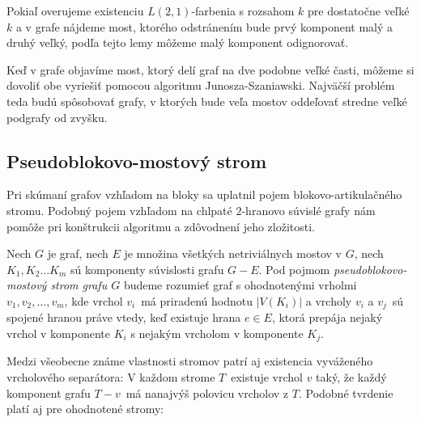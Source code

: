 Pokiaľ overujeme existenciu $L(2,1)$-farbenia s rozsahom $k$ pre dostatočne veľké $k$ a v grafe
nájdeme most, ktorého odstránením bude prvý komponent malý a druhý veľký, podľa tejto lemy
môžeme malý komponent odignorovať.

Keď v grafe objavíme most, ktorý delí graf na dve podobne veľké časti, môžeme si dovoliť
obe vyriešiť pomocou algoritmu Junosza-Szaniawski. Najväčší problém teda budú spôsobovať
grafy, v ktorých bude veľa mostov oddeľovať stredne veľké podgrafy od zvyšku.

\subsection{Pseudoblokovo-mostový strom}

Pri skúmaní grafov vzhľadom na bloky sa uplatnil pojem blokovo-artikulačného stromu.
Podobný pojem vzhľadom na chlpaté $2$-hranovo súvislé grafy nám pomôže pri konštrukcii
algoritmu a zdôvodnení jeho zložitosti.

\begin{defn}
    Nech $G$ je graf, nech $E$ je množina všetkých netriviálnych mostov v $G$, nech
    $K_1, K_2 \ldots K_m$ sú komponenty súvislosti grafu $G - E$. Pod pojmom \emph{pseudoblokovo-mostový
    strom grafu $G$} budeme rozumieť graf s ohodnotenými vrholmi $v_1, v_2, \ldots, v_m$, kde
    vrchol $v_i$ má priradenú hodnotu $|V(K_i)|$ a vrcholy $v_i$ a $v_j$ sú spojené hranou
    práve vtedy, keď existuje hrana $e \in E$, ktorá prepája nejaký vrchol v komponente $K_i$
    s nejakým vrcholom v komponente $K_j$.
\end{defn}

Medzi všeobecne známe vlastnosti stromov patrí aj existencia vyváženého vrcholového separátora:
V každom strome $T$ existuje vrchol $v$ taký, že každý komponent grafu $T-v$ má nanajvýš polovicu
vrcholov z $T$. Podobné tvrdenie platí aj pre ohodnotené stromy:

